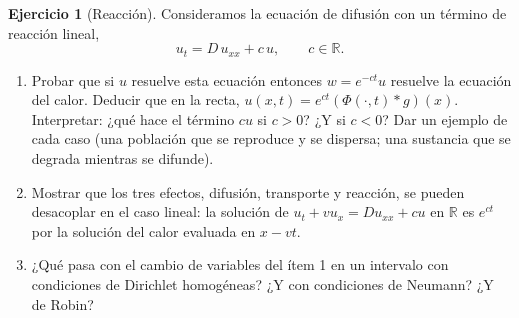 \documentclass[12pt, a4paper]{amsbook}
\newcommand{\R}{{\mathbb R}}
\theoremstyle{remark}
\theoremstyle{definition}
\newtheorem{ejer}[teo]{Ejercicio}
\numberwithin{section}{chapter}
\numberwithin{subsection}{section}
\numberwithin{equation}{section}
\numberwithin{figure}{chapter}
\begin{document}
\begin{ejer}[Reacción]\label{ejer:reaccion}
Consideramos la ecuación de difusión con un término de reacción lineal,
$$
u_t = D\,u_{xx} + c\,u,\qquad c\in\R .
$$
\begin{enumerate}
\item Probar que si $u$ resuelve esta ecuación entonces $w = e^{-ct}u$ resuelve la ecuación del calor. Deducir que en la recta, $u(x,t) = e^{ct}(\Phi(\cdot,t)*g)(x)$. Interpretar: ¿qué hace el término $cu$ si $c>0$? ¿Y si $c<0$? Dar un ejemplo de cada caso (una población que se reproduce y se dispersa; una sustancia que se degrada mientras se difunde).
\item Mostrar que los tres efectos, difusión, transporte y reacción, se pueden desacoplar en el caso lineal: la solución de $u_t + vu_x = Du_{xx} + cu$ en $\R$ es $e^{ct}$ por la solución del calor evaluada en $x-vt$.
\item ¿Qué pasa con el cambio de variables del ítem 1 en un intervalo con condiciones de Dirichlet homogéneas? ¿Y con condiciones de Neumann? ¿Y de Robin?
\end{enumerate}
\end{ejer}
\end{document}

